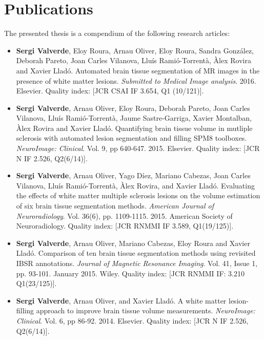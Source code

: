 
\chapter*{Publications}


The presented thesis is a compendium of the following research articles:

\begin{itemize}

\item  \textbf{Sergi Valverde}, Eloy Roura, Arnau Oliver, Eloy Roura, Sandra Gonz\'{a}lez, Deborah Pareto, Joan Carles Vilanova, Llu\'{i}s Rami\'{o}-Torrent\`{a}, \`{A}lex Rovira and Xavier Llad\'{o}.  Automated brain tissue segmentation of MR images in the presence of white matter lesions. \textit{Submitted to Medical Image analysis}. 2016. Elsevier.  Quality index:  [JCR CSAI IF 3.654, Q1 (10/121)].

\item \textbf{Sergi Valverde}, Arnau Oliver, Eloy Roura, Deborah Pareto, Joan Carles Vilanova, Llu\'{i}s Rami\'{o}-Torrent\`{a}, Jaume Sastre-Garriga, Xavier Montalban, \`{A}lex Rovira and Xavier Llad\'{o}. Quantifying brain tissue volume in mutliple sclerosis with automated lesion segmentation and filling SPM8 toolboxes. \textit{NeuroImage: Clinical}. Vol. 9, pp 640-647. 2015. Elsevier.  Quality index:  [JCR N IF 2.526, Q2(6/14)].

\item  \textbf{Sergi Valverde}, Arnau Oliver, Yago D\'{i}ez, Mariano Cabezas, Joan Carles Vilanova, Llu\'{i}s Rami\'{o}-Torrent\`{a}, \`{A}lex Rovira, and Xavier Llad\'o. Evaluating the effects of white matter multiple sclerosis lesions on the volume estimation of six brain tissue segmentation methods. \textit{American Journal of Neuroradiology}. Vol. 36(6), pp. 1109-1115. 2015. American Society of Neuroradiology.  Quality index: [JCR RNMMI IF 3.589, Q1(19/125)].

\item \textbf{Sergi Valverde}, Arnau Oliver, Mariano Cabezas, Eloy Roura and Xavier Llad\'{o}. Comparison of ten brain tissue segmentation methods using revisited IBSR annotations. \textit{Journal of Magnetic Resonance Imaging}. Vol. 41, Issue 1, pp. 93-101. January 2015. Wiley.  Quality index: [JCR RNMMI IF: 3.210 Q1(23/125)].

\item  \textbf{Sergi Valverde}, Arnau Oliver, and Xavier Llad\'o. A white matter lesion-filling approach to improve brain tissue volume measurements. \textit{NeuroImage: Clinical}. Vol. 6, pp 86-92. 2014. Elsevier. Quality index: [JCR N IF 2.526, Q2(6/14)].

\end{itemize}


